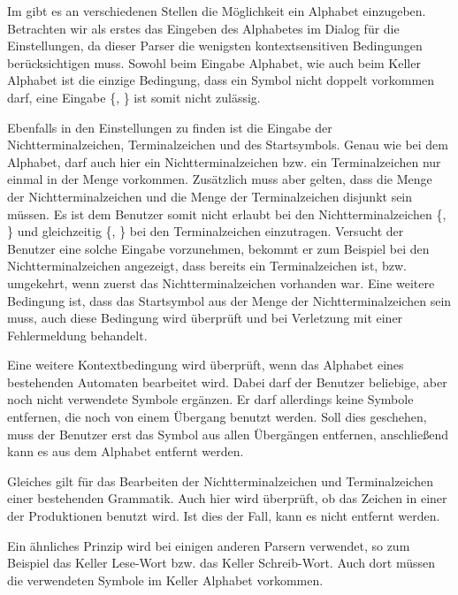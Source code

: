 Im \gtitool gibt es an verschiedenen Stellen die Möglichkeit ein Alphabet
einzugeben. Betrachten wir als erstes das Eingeben des Alphabetes im Dialog für
die Einstellungen, da dieser Parser die wenigsten kontextsensitiven Bedingungen
berücksichtigen muss. Sowohl beim Eingabe Alphabet, wie auch beim Keller
Alphabet ist die einzige Bedingung, dass ein Symbol nicht doppelt vorkommen
darf, eine Eingabe \{, \} ist somit nicht
zulässig.\vspace{10pt}

Ebenfalls in den Einstellungen zu finden ist die Eingabe der
Nichtterminalzeichen, Terminalzeichen und des Startsymbols. Genau wie bei dem
Alphabet, darf auch hier ein Nichtterminalzeichen bzw. ein Terminalzeichen nur
einmal in der Menge vorkommen. Zusätzlich muss aber gelten, dass die Menge der
Nichtterminalzeichen  und die Menge der Terminalzeichen disjunkt sein müssen. Es
ist dem Benutzer somit nicht erlaubt bei den Nichtterminalzeichen
\{, \} und gleichzeitig
\{, \} bei den Terminalzeichen einzutragen.
Versucht der Benutzer eine solche Eingabe vorzunehmen, bekommt er zum Beispiel
bei den Nichtterminalzeichen angezeigt, dass  bereits ein
Terminalzeichen ist, bzw. umgekehrt, wenn zuerst das Nichtterminalzeichen
vorhanden war. Eine weitere Bedingung ist, dass das Startsymbol aus der Menge der
Nichtterminalzeichen sein muss, auch diese Bedingung wird überprüft und bei
Verletzung mit einer Fehlermeldung behandelt.\vspace{10pt}

Eine weitere Kontextbedingung wird überprüft, wenn das Alphabet eines
bestehenden Automaten bearbeitet wird. Dabei darf der Benutzer beliebige, aber
noch nicht verwendete Symbole ergänzen. Er darf allerdings keine Symbole
entfernen, die noch von einem Übergang benutzt werden. Soll dies geschehen,
muss der Benutzer erst das Symbol aus allen Übergängen entfernen,
anschließend kann es aus dem Alphabet entfernt werden.\vspace{10pt}

Gleiches gilt für das Bearbeiten der Nichtterminalzeichen und Terminalzeichen
einer bestehenden Grammatik. Auch hier wird überprüft, ob das Zeichen in einer
der Produktionen benutzt wird. Ist dies der Fall, kann es nicht entfernt
werden.\vspace{10pt}

Ein ähnliches Prinzip wird bei einigen anderen Parsern verwendet, so zum
Beispiel das Keller Lese-Wort bzw. das Keller Schreib-Wort. Auch dort müssen
die verwendeten Symbole im Keller Alphabet vorkommen.\vspace{10pt}


